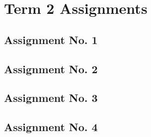 \chapter{Term 2 Assignments}
\section{Assignment No. 1}
\section{Assignment No. 2}           
\section{Assignment No. 3}
\section{Assignment No. 4}